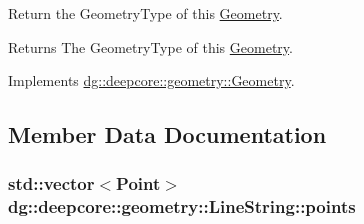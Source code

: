 Return the Geometry\+Type of this \hyperlink{structdg_1_1deepcore_1_1geometry_1_1_geometry}{Geometry}. 

\begin{DoxyReturn}{Returns}
The Geometry\+Type of this \hyperlink{structdg_1_1deepcore_1_1geometry_1_1_geometry}{Geometry}. 
\end{DoxyReturn}


Implements \hyperlink{group___geometry_module_gacdfc02ad835493ef40a398bdf24e30a1}{dg\+::deepcore\+::geometry\+::\+Geometry}.



\subsection{Member Data Documentation}
\subsubsection[{\texorpdfstring{points}{points}}]{\setlength{\rightskip}{0pt plus 5cm}std\+::vector$<${\bf Point}$>$ dg\+::deepcore\+::geometry\+::\+Line\+String\+::points}\hypertarget{structdg_1_1deepcore_1_1geometry_1_1_line_string_a7f030a2603076ad9d9ddc0d752c30ff5}{}\label{structdg_1_1deepcore_1_1geometry_1_1_line_string_a7f030a2603076ad9d9ddc0d752c30ff5}
